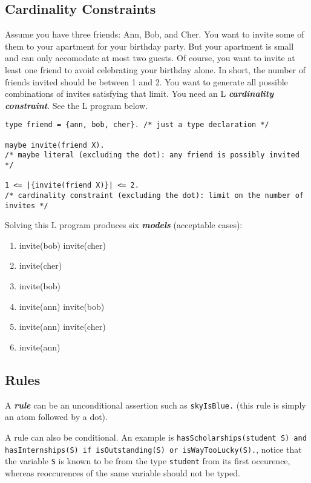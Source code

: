 \documentclass[letterpaper,10pt]{article}
\begin{document}
\begin{flushleft}
\subsection{Cardinality Constraints}

Assume you have three friends: Ann, Bob, and Cher. You want to invite some of them to your apartment for your birthday party. But your apartment is small and can only accomodate at most two guests. Of course, you want to invite at least one friend to avoid celebrating your birthday alone. In short, the number of friends invited should be between 1 and 2. You want to generate all possible combinations of invites satisfying that limit. You need an L \textbf{\textit{cardinality constraint}}. See the L program below.

\begin{verbatim}
type friend = {ann, bob, cher}. /* just a type declaration */

maybe invite(friend X). 
/* maybe literal (excluding the dot): any friend is possibly invited */

1 <= |{invite(friend X)}| <= 2. 
/* cardinality constraint (excluding the dot): limit on the number of invites */
\end{verbatim}

Solving this L program produces six \textbf{\textit{models}} (acceptable cases):
\begin{enumerate}
\item invite(bob) invite(cher)
\item invite(cher)
\item invite(bob)
\item invite(ann) invite(bob)
\item invite(ann) invite(cher)
\item invite(ann)
\end{enumerate}

\pagebreak

\subsection{Rules} \label{rl}

A \textbf{\textit{rule}} can be an unconditional assertion such as \texttt{skyIsBlue.} (this rule is simply an atom followed by a dot). 

A rule can also be conditional. An example is \texttt{hasScholarships(student S) and hasInternships(S) if isOutstanding(S) or isWayTooLucky(S).}, notice that the variable \texttt{S} is known to be from the type \texttt{student} from its first occurence, whereas reoccurences of the same variable should not be typed.


\end{flushleft}
\end{document}
